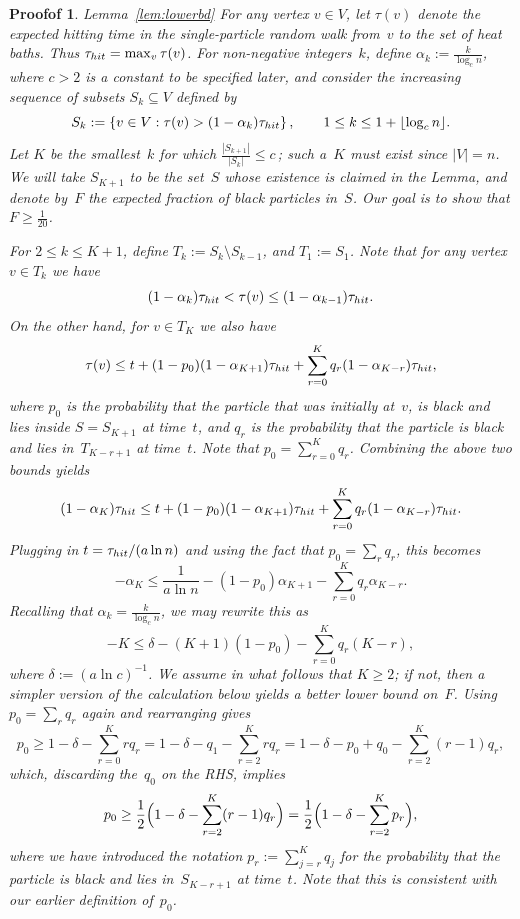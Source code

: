 \documentclass[10pt,a4paper]{amsart}
\newtheorem{proofof}{Proofof}
\newcommand{\hit}{\tau_{\rm hit}}
\begin{document}
\begin{proofof}{Lemma~\ref{lem:lowerbd}}
For any vertex $v\in V$, let $\tau(v)$ denote the expected hitting time in the single-particle random walk
from~$v$ to the set of heat baths. 
Thus $\hit=\max_v \tau(v)$.  For non-negative integers~$k$, define $\alpha_k:=\frac{k}{\log_c n}$, where $c>2$
is a constant to be specified later, and consider the increasing sequence of subsets $S_k\subseteq V$ defined by $$
   S_k := \left\{v\in V: \tau(v) > (1-\alpha_k)\hit\right\},\qquad 1\le k\le 1+\lfloor\log_c n\rfloor.  $$
Let $K$ be the smallest~$k$ for which $\frac{|S_{k+1}|}{|S_k|} \le c\,$; such a~$K$ must exist
since $|V|=n$.  We will take $S_{K+1}$ to be the set~$S$ whose existence is claimed in the Lemma, 
and denote by~$F$ the expected fraction of black particles in~$S$. Our goal is to show that $F\ge\frac{1}{20}$.

For $2\le k\le K+1$, define $T_k:=S_k\setminus S_{k-1}$, and $T_1:=S_1$.  Note that for any vertex $v\in T_k$ we have $$
    (1-\alpha_k)\hit < \tau(v) \le (1-\alpha_{k-1})\hit.  $$
On the other hand, for $v\in T_K$ we also have $$
    \tau(v) \le t + (1-p_0)(1-\alpha_{K+1})\hit + \sum_{r=0}^{K} q_r(1-\alpha_{K-r})\hit,   $$
where $p_0$ is the probability that the particle that was initially at~$v$, is black and lies inside $S=S_{K+1}$ at time~$t$,
and $q_r$ is the probability that the particle is black and lies in~$T_{K-r+1}$ at time~$t$.  Note that $p_0=\sum_{r=0}^K q_r $.
Combining the above two bounds yields $$
    (1-\alpha_K)\hit \le t + (1-p_0)(1-\alpha_{K+1})\hit + \sum_{r=0}^{K} q_r(1-\alpha_{K-r})\hit.  $$
Plugging in $t=\hit/(a\ln n)$ and using the fact that $p_0 = \sum_r q_r$, this becomes $$
    -\alpha_K \le \frac{1}{a\ln n}  -(1-p_0)\alpha_{K+1} - \sum_{r=0}^{K} q_r\alpha_{K-r}.  $$
Recalling that $\alpha_k=\frac{k}{\log_c n}$, we may rewrite this as $$
    -K \le \delta -(K+1)(1-p_0) - \sum_{r=0}^{K} q_r(K-r), $$
where $\delta:=(a\ln c)^{-1}$.  We assume in what follows that $K\ge 2$; if not, then a simpler version of 
the calculation below yields a better lower bound on~$F$.  Using $p_0 = \sum_r q_r$ again and rearranging gives $$
     p_0 \ge 1-\delta - \sum_{r=0}^{K} rq_r = 1 - \delta - q_1 - \sum_{r=2}^K rq_r = 1 - \delta -p_0 + q_0 - \sum_{r=2}^K (r-1)q_r,  $$
which, discarding the~$q_0$ on the RHS, implies
\begin{equation}\label{eq:pbound}
     p_0 \ge \frac{1}{2}\Bigl(1-\delta - \sum_{r=2}^K (r-1)q_r\Bigr) =\frac{1}{2}\Bigl(1-\delta - \sum_{r=2}^K p_r\Bigr),
\end{equation}     
where we have introduced the notation $p_r:=\sum_{j=r}^K q_j$ for the probability that the particle is black
and lies in~$S_{K-r+1}$ at time~$t$.  Note that this is consistent with our earlier definition of~$p_0$.
   

\end{proofof}
\end{document}
